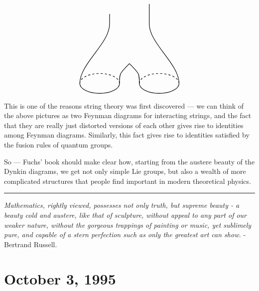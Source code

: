 \documentclass{article}
\begin{document}
\begin{enumerate}
\[\begin{tikzpicture}[scale=0.5]
\begin{scope}
         \draw[thick] (2,-6) to (2,-7);
       \end{scope}
       \begin{scope}[rotate=180,shift={(0,14)}]
         \begin{scope}[shift={(-3,0)},rotate=180]
           \draw[thick,dashed] (0:2cm and 1cm) arc (0:180:2cm and 1cm);
           \draw[thick] (180:2cm and 1cm) arc (180:360:2cm and 1cm);
         \end{scope}
         \begin{scope}[shift={(3,0)},rotate=180]
           \draw[thick,dashed] (0:2cm and 1cm) arc (0:180:2cm and 1cm);
           \draw[thick] (180:2cm and 1cm) arc (180:360:2cm and 1cm);
         \end{scope}
         \draw[thick] (-5,0) .. controls (-5,-2) and (-2,-4) .. (-2,-6);
         \draw[thick] (5,0) .. controls (5,-2) and (2,-4) .. (2,-6);
         \draw[thick] (-1,0) .. controls (-1,-1) .. (0,-2);
         \draw[thick] (1,0) .. controls (1,-1) .. (0,-2);
         \draw[thick] (-2,-6) to (-2,-7);
         \draw[thick] (2,-6) to (2,-7);
       \end{scope}
     \end{tikzpicture}
   \] This is one of the reasons string theory was first discovered ---
  we can think of the above pictures as two Feynman diagrams for
  interacting strings, and the fact that they are really just distorted
  versions of each other gives rise to identities among Feynman
  diagrams. Similarly, this fact gives rise to identities satisfied by
  the fusion rules of quantum groups.
\end{enumerate}

So --- Fuchs' book should make clear how, starting from the austere
beauty of the Dynkin diagrams, we get not only simple Lie groups, but
also a wealth of more complicated structures that people find important
in modern theoretical physics.

\begin{center}\rule{0.5\linewidth}{0.5pt}\end{center}

\emph{Mathematics, rightly viewed, possesses not only truth, but supreme
beauty - a beauty cold and austere, like that of sculpture, without
appeal to any part of our weaker nature, without the gorgeous trappings
of painting or music, yet sublimely pure, and capable of a stern
perfection such as only the greatest art can show.} - Bertrand Russell.
\hypertarget{week65}{%
\section{October 3, 1995}\label{week65}}
\end{document}
